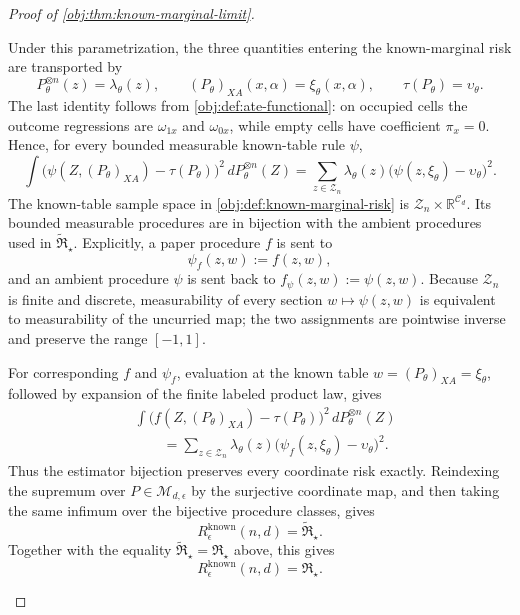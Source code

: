 \documentclass[11pt]{article}
\begin{document}
\begin{proof}[Proof of \cref{obj:thm:known-marginal-limit}]
\begin{enumerate}
Under this parametrization, the three quantities entering the known-marginal risk are transported by
\[
P_\theta^{\otimes n}(z)=\lambda_\theta(z),
\qquad
(P_\theta)_{XA}(x,\alpha)=\xi_\theta(x,\alpha),
\qquad
\tau(P_\theta)=\upsilon_\theta .
\]
The last identity follows from \cref{obj:def:ate-functional}: on occupied cells the outcome regressions are \(\omega_{1x}\) and \(\omega_{0x}\), while empty cells have coefficient \(\pi_x=0\).  Hence, for every bounded measurable known-table rule \(\psi\),
\[
\int
\bigl(\psi(Z,(P_\theta)_{XA})-\tau(P_\theta)\bigr)^2
\,dP_\theta^{\otimes n}(Z)
=
\sum_{z\in\mathcal Z_n}\lambda_\theta(z)
\bigl(\psi(z,\xi_\theta)-\upsilon_\theta\bigr)^2 .
\]
The known-table sample space in \cref{obj:def:known-marginal-risk} is
\(\mathcal Z_n\times\mathbb R^{\mathcal C_d}\).  Its bounded measurable
procedures are in bijection with the ambient procedures used in
\(\widetilde{\mathfrak R}_\star\).  Explicitly, a paper procedure \(f\)
is sent to
\[
\psi_f(z,w):=f(z,w),
\]
and an ambient procedure \(\psi\) is sent back to
\(f_\psi(z,w):=\psi(z,w)\).  Because \(\mathcal Z_n\) is finite and
discrete, measurability of every section \(w\mapsto\psi(z,w)\) is
equivalent to measurability of the uncurried map; the two assignments are
pointwise inverse and preserve the range \([-1,1]\).

For corresponding \(f\) and \(\psi_f\), evaluation at the known table
\(w=(P_\theta)_{XA}=\xi_\theta\), followed by expansion of the finite
labeled product law, gives
\[
\begin{aligned}
&\int
\bigl(f(Z,(P_\theta)_{XA})-\tau(P_\theta)\bigr)^2
\,dP_\theta^{\otimes n}(Z)\\
&\qquad =
\sum_{z\in\mathcal Z_n}\lambda_\theta(z)
\bigl(\psi_f(z,\xi_\theta)-\upsilon_\theta\bigr)^2.
\end{aligned}
\]
Thus the estimator bijection preserves every coordinate risk exactly.
Reindexing the supremum over \(P\in\mathcal M_{d,\epsilon}\) by the
surjective coordinate map, and then taking the same infimum over the
bijective procedure classes, gives
\[
R_\epsilon^{\mathrm{known}}(n,d)
=
\widetilde{\mathfrak R}_\star .
\]
Together with the equality \(\widetilde{\mathfrak R}_\star=\mathfrak R_\star\) above, this gives
\[
R_\epsilon^{\mathrm{known}}(n,d)=\mathfrak R_\star .
\]


\end{enumerate}
\end{proof}
\end{document}
